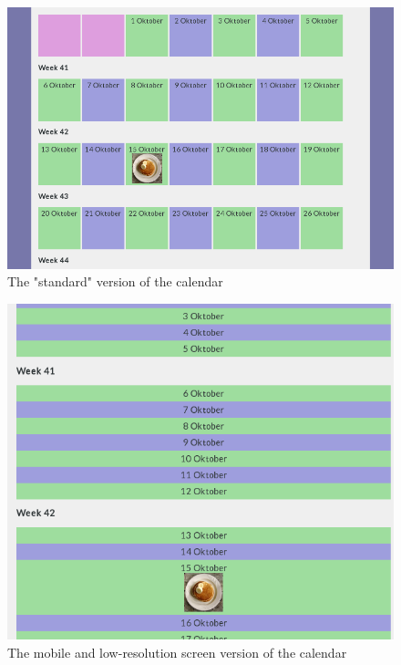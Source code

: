 \documentclass[a4paper]{scrartcl}
\begin{document}
\begin{figure}[!h]
  \begin{center}
    \includegraphics[scale=0.4]{calendargrid.png}
    \caption{The "standard" version of the calendar}
    \label{fig:calgrid}
  \end{center}
\end{figure}

\begin{figure}[!h]
  \begin{center}
    \includegraphics[scale=0.4]{calendarvert.png}
    \caption{The mobile and low-resolution screen version of the calendar}
    \label{fig:calvert}
  \end{center}
\end{figure}
\end{document}
